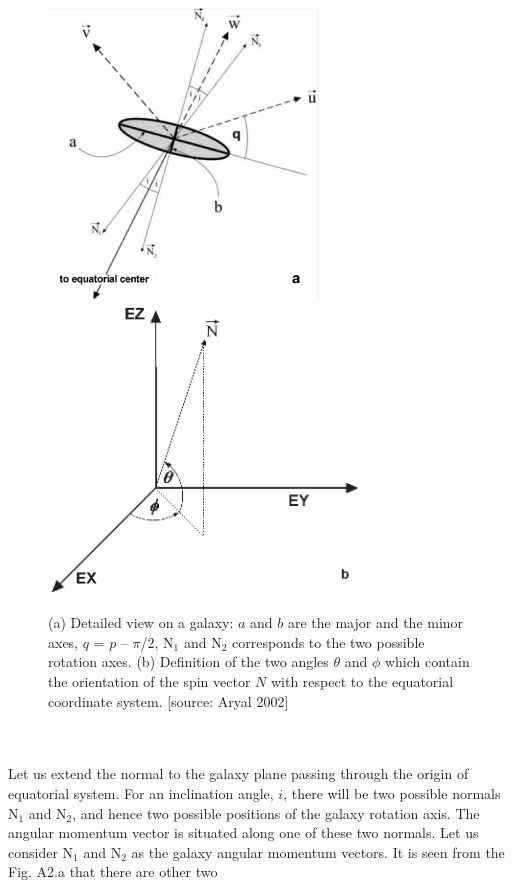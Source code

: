 \begin{figure} \vspace{0.0cm}
      \centering
      \includegraphics[height=7.7cm]{Godlowski2}
      \includegraphics[height=7.7cm]{Godlowski3}
      \caption[]{(a) Detailed view on a galaxy: $a$ and $b$ are the major
      and the minor axes, $q$ = $p$ -- $\pi$/2, N$_1$ and N$_2$ corresponds to the
      two possible rotation axes. (b) Definition of the two angles $\theta$ and $\phi$
      which contain the orientation of the spin vector $N$ with respect
      to the equatorial coordinate system. [source: Aryal 2002]}
\end{figure}
\\
\\
Let us extend the normal to the galaxy plane passing through the
origin of equatorial system. For an inclination angle, $i$, there
will be two possible normals N$_1$ and N$_2$, and hence two
possible positions of the galaxy rotation axis. The angular
momentum vector is situated along one of these two normals.  Let
us consider N$_1$ and N$_2$ as the galaxy angular momentum
vectors. It is seen from the Fig. A2.a that there are other two
